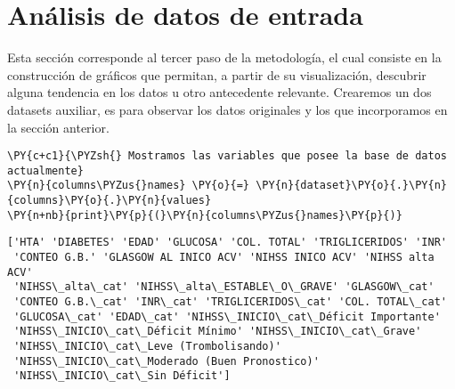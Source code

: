     \hypertarget{anuxe1lisis-de-datos-de-entrada}{%
\section{Análisis de datos de entrada}\label{anuxe1lisis-de-datos-de-entrada}}

Esta sección corresponde al tercer paso de la metodología, el cual consiste en la construcción de gráficos que permitan, a partir de su visualización, descubrir alguna tendencia en los datos u otro antecedente relevante. Crearemos un dos datasets auxiliar, es para observar los datos originales y los que incorporamos en la sección anterior.

    \begin{tcolorbox}[breakable, size=fbox, boxrule=1pt, pad at break*=1mm,colback=cellbackground, colframe=cellborder]
\begin{Verbatim}[commandchars=\\\{\}]
\PY{c+c1}{\PYZsh{} Mostramos las variables que posee la base de datos actualmente}
\PY{n}{columns\PYZus{}names} \PY{o}{=} \PY{n}{dataset}\PY{o}{.}\PY{n}{columns}\PY{o}{.}\PY{n}{values}
\PY{n+nb}{print}\PY{p}{(}\PY{n}{columns\PYZus{}names}\PY{p}{)}
\end{Verbatim}
\end{tcolorbox}

    \begin{Verbatim}[commandchars=\\\{\}]
['HTA' 'DIABETES' 'EDAD' 'GLUCOSA' 'COL. TOTAL' 'TRIGLICERIDOS' 'INR'
 'CONTEO G.B.' 'GLASGOW AL INICO ACV' 'NIHSS INICO ACV' 'NIHSS alta ACV'
 'NIHSS\_alta\_cat' 'NIHSS\_alta\_ESTABLE\_O\_GRAVE' 'GLASGOW\_cat'
 'CONTEO G.B.\_cat' 'INR\_cat' 'TRIGLICERIDOS\_cat' 'COL. TOTAL\_cat'
 'GLUCOSA\_cat' 'EDAD\_cat' 'NIHSS\_INICIO\_cat\_Déficit Importante'
 'NIHSS\_INICIO\_cat\_Déficit Mínimo' 'NIHSS\_INICIO\_cat\_Grave'
 'NIHSS\_INICIO\_cat\_Leve (Trombolisando)'
 'NIHSS\_INICIO\_cat\_Moderado (Buen Pronostico)'
 'NIHSS\_INICIO\_cat\_Sin Déficit']
    \end{Verbatim}

